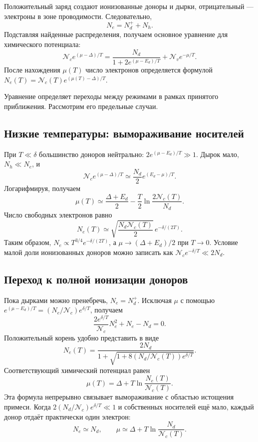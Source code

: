 \documentclass[../final.tex]{subfiles}
\begin{document}
Положительный заряд создают ионизованные доноры и дырки, отрицательный
--- электроны в зоне проводимости. Следовательно,
\[
N_e=N_d^++N_h.
\]
Подставляя найденные распределения, получаем основное уравнение
для химического потенциала:
\[
\mathcal N_c e^{(\mu-\Delta)/T}
    =\frac{N_d}{1+2e^{(\mu-E_d)/T}}+\mathcal N_v e^{-\mu/T}.
\]
После нахождения $\mu(T)$ число электронов определяется формулой
$N_e(T)=\mathcal N_c(T)e^{(\mu(T)-\Delta)/T}$.

Уравнение определяет переходы между режимами в рамках принятого
приближения. Рассмотрим его предельные случаи.

\subsection*{Низкие температуры: вымораживание носителей}

При $T\ll\delta$ большинство доноров нейтрально:
$2e^{(\mu-E_d)/T}\gg1$. Дырок мало, $N_h\ll N_e$, и
\[
\mathcal N_c e^{(\mu-\Delta)/T}
    \simeq\frac{N_d}{2}e^{(E_d-\mu)/T}.
\]
Логарифмируя, получаем
\[
\mu(T)\simeq\frac{\Delta+E_d}{2}
    -\frac T2\ln\frac{2\mathcal N_c(T)}{N_d}.
\]
Число свободных электронов равно
\[
N_e(T)\simeq\sqrt{\frac{N_d\mathcal N_c(T)}{2}}
    \,e^{-\delta/(2T)}.
\]
Таким образом, $N_e\propto T^{3/4}e^{-\delta/(2T)}$, а
$\mu\to(\Delta+E_d)/2$ при $T\to0$. Условие малой доли ионизованных
доноров можно записать как
$\mathcal N_c e^{-\delta/T}\ll2N_d$.

\subsection*{Переход к полной ионизации доноров}

Пока дырками можно пренебречь, $N_e=N_d^+$. Исключая $\mu$ с помощью
$e^{(\mu-E_d)/T}=(N_e/\mathcal N_c)e^{\delta/T}$, получаем
\[
\frac{2e^{\delta/T}}{\mathcal N_c}N_e^2+N_e-N_d=0.
\]
Положительный корень удобно представить в виде
\[
N_e(T)=\frac{2N_d}
    {1+\sqrt{1+8(N_d/\mathcal N_c(T))e^{\delta/T}}}.
\]
Соответствующий химический потенциал равен
\[
\mu(T)=\Delta+T\ln\frac{N_e(T)}{\mathcal N_c(T)}.
\]
Эта формула непрерывно связывает вымораживание с областью истощения
примеси. Когда
$2(N_d/\mathcal N_c)e^{\delta/T}\ll1$ и собственных носителей ещё мало,
каждый донор отдаёт практически один электрон:
\[
N_e\simeq N_d,\qquad
    \mu\simeq\Delta+T\ln\frac{N_d}{\mathcal N_c(T)}.
\]
\end{document}
